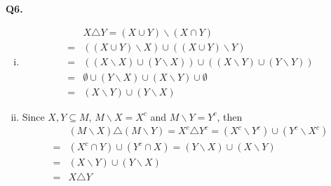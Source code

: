 \documentclass{article}[12pt]
\begin{document}
\noindent \textbf{Q6.}
\begin{enumerate}[(i)]
\item 
\begin{align*}
&X \triangle Y
=(X \cup Y) \backslash(X \cap Y)\\=
&((X \cup Y)\backslash X) \cup ((X \cup Y)\backslash Y)\\=&((X \backslash X)\cup (Y \backslash X))\cup ((X \backslash Y)\cup (Y \backslash Y))\\
=&\emptyset\cup (Y \backslash X) \cup (X \backslash Y) \cup \emptyset\\
=&(X \backslash Y) \cup(Y \backslash X)
\end{align*}
\item Since $X,Y\subseteq M$, $M\backslash X=X^c$ and $M\backslash Y=Y^c$, then
\begin{align*}
&(M \backslash X) \triangle(M \backslash Y)
= X^c \triangle Y^c =(X^c \backslash Y^c) \cup(Y^c \backslash X^c)\\
=& (X^c \cap Y)\cup (Y^c \cap X)=(Y\backslash X)\cup (X\backslash Y)\\
=&(X \backslash Y) \cup(Y \backslash X)\\
=&X \triangle Y
\end{align*}

\end{enumerate}
\end{document}
